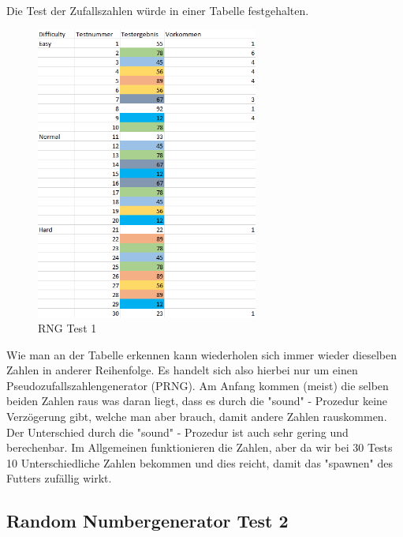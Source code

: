 \documentclass[a4paper,10pt]{article}
\begin{document}
			Die Test der Zufallszahlen würde in einer Tabelle festgehalten.\\
			\begin{figure}[h]
				\centering
				\includegraphics[width=0.65\textwidth]{tests}
				\caption{RNG Test 1}
				\label{RNG1}
			\end{figure}
			
			Wie man an der Tabelle erkennen kann wiederholen sich immer wieder 
			dieselben Zahlen in anderer Reihenfolge. Es handelt sich also 
			hierbei nur um einen Pseudozufallszahlengenerator (PRNG). Am Anfang 
			kommen (meist) die selben beiden Zahlen raus was daran liegt, dass 
			es durch die "sound" - Prozedur keine Verzögerung gibt, welche man 
			aber brauch, damit andere Zahlen rauskommen. Der Unterschied durch 
			die "sound" - Prozedur ist auch sehr gering und berechenbar. Im 
			Allgemeinen funktionieren die Zahlen, aber da wir bei 30 Tests 10 
			Unterschiedliche Zahlen bekommen und dies reicht, damit das 
			"spawnen" des Futters zufällig wirkt.
			\newpage
		\subsection{Random Numbergenerator Test 2}
		
\end{document}
